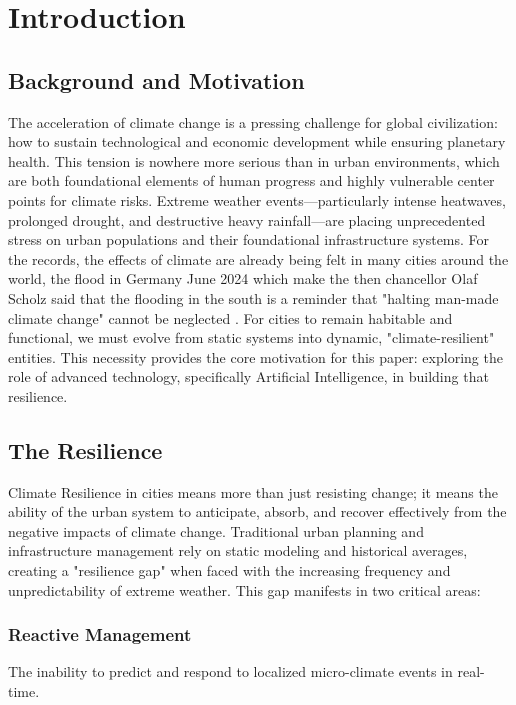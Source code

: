 \documentclass[12pt]{article}
\begin{document}
\section{Introduction}
\subsection{Background and Motivation}

The acceleration of climate change is a pressing challenge for global civilization: how to sustain 
technological and economic development while ensuring planetary health. This tension is nowhere more serious 
than in urban environments, which are both foundational elements of human progress and highly vulnerable center 
points for climate risks. Extreme weather events—particularly intense heatwaves, prolonged drought, and 
destructive heavy rainfall—are placing unprecedented stress on urban populations and their foundational 
infrastructure systems. For the records, the effects of climate are already being felt in many cities around the world,
the flood in Germany June 2024 which make the then chancellor Olaf Scholz said that the flooding in the south is a 
reminder that "halting man-made climate change" cannot be neglected \cite{bbc2024germany}. 
For cities to remain habitable and functional, we must evolve from static systems 
into dynamic, "climate-resilient" entities. This necessity provides the core motivation for this paper: 
exploring the role of advanced technology, specifically Artificial Intelligence, in building that resilience.

\subsection{The Resilience}
Climate Resilience in cities means more than just resisting change; it means the ability of the urban system to anticipate, 
absorb, and recover effectively from the negative impacts of climate change.
Traditional urban planning and infrastructure management rely on static modeling and historical averages, 
creating a "resilience gap" when faced with the increasing frequency and unpredictability of extreme weather. 
This gap manifests in two critical areas:

\subsubsection{Reactive Management} The inability to predict and respond to localized micro-climate events in real-time.
\end{document}
